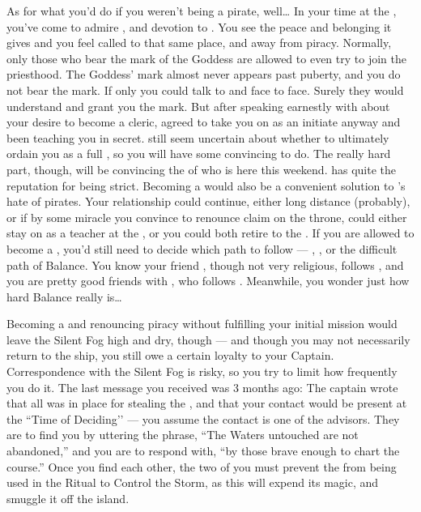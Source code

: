 \documentclass[char]{GL2020}
\begin{document}
As for what you'd do if you weren't being a pirate, well\ldots{} In your time at the \pSc{}, you've come to admire \cFlowPriest{\full}, and \cFlowPriest{\their} devotion to \cFlow{}. You see the peace and belonging it gives \cFlowPriest{\them} and you feel called to that same place, and away from piracy. Normally, only those who bear the mark of the Goddess are allowed to even try to join the priesthood. The Goddess' mark almost never appears past puberty, and you do not bear the mark. If only you could talk to \cEbb{} and \cFlow{} face to face. Surely they would understand and grant you the mark. But after speaking earnestly with \cFlowPriest{} about your desire to become a cleric, \cFlowPriest{\they} agreed to take you on as an initiate anyway and \cFlowPriest{\have} been teaching you in secret. \cFlowPriest{\They} still seem\cFlowPriest{\verbs} uncertain about whether to ultimately ordain you as a full \cPirate{\cleric}, so you will have some convincing to do. The really hard part, though, will be convincing the \cEbbPriest{\cleric} of \cEbb{} who is here this weekend. \cEbbPriest{\full} has quite the reputation for being strict. Becoming a \cPirate{\cleric} would also be a convenient solution to \cPrince{}'s hate of pirates. Your relationship could continue, either long distance (probably), or if by some miracle you convince \cPrince{} to renounce \cPrince{\their} claim on the throne, \cPrince{\they} could either stay on as a teacher at the \pSc{}, or you could both retire to the \pShip{}. If you are allowed to become a \cPirate{\cleric}, you'd still need to decide which path to follow — \cEbb{}, \cFlow{}, or the difficult path of Balance. You know your friend \cBunker{}, though not very religious, follows \cEbb{}, and you are pretty good friends with \cFlowPriest{}, who follows \cFlow{}. Meanwhile, you wonder just how hard Balance really is\ldots{}

Becoming a \cPirate{\cleric} and renouncing piracy without fulfilling your initial mission would leave the Silent Fog high and dry, though — and though you may not necessarily return to the ship, you still owe a certain loyalty to your Captain. Correspondence with the Silent Fog is risky, so you try to limit how frequently you do it. The last message you received was 3 months ago: The captain wrote that all was in place for stealing the \iNet{}, and that your contact would be present at the ``Time of Deciding’’ — you assume the contact is one of the advisors. They are to find you by uttering the phrase, ``The Waters untouched are not abandoned,'' and you are to respond with, ``by those brave enough to chart the course.'' Once you find each other, the two of you must prevent the \iNet{} from being used in the Ritual to Control the Storm, as this will expend its magic, and smuggle it off the island.
\end{document}
